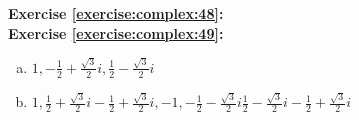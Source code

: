 \noindent\textbf{Exercise \ref{exercise:complex:48}:}\\

\noindent\textbf{Exercise \ref{exercise:complex:49}:}
\begin{enumerate}[(a)]
\item
$1, -\displaystyle\frac{1}{2}+\displaystyle\frac{\sqrt{3}}{2}i, \displaystyle\frac{1}{2}-\displaystyle\frac{\sqrt{3}}{2}i$
\item
$1, 
\displaystyle\frac{1}{2}+\displaystyle\frac{\sqrt{3}}{2}i
-\displaystyle\frac{1}{2}+\displaystyle\frac{\sqrt{3}}{2}i,
-1, 
-\displaystyle\frac{1}{2}-\displaystyle\frac{\sqrt{3}}{2}i
\displaystyle\frac{1}{2}-\displaystyle\frac{\sqrt{3}}{2}i
-\displaystyle\frac{1}{2}+\displaystyle\frac{\sqrt{3}}{2}i
$
\end{enumerate}


